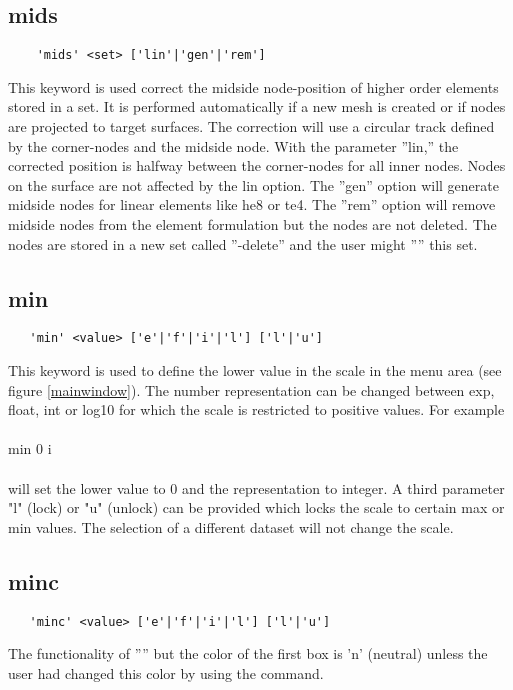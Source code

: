 \documentclass{article}
\begin{document}
\subsection{\label{mids}mids}
\begin{verbatim}
    'mids' <set> ['lin'|'gen'|'rem']
\end{verbatim}
This keyword is used correct the midside node-position of higher order elements stored in a set. It is performed automatically if a new mesh is created or if nodes are projected to target surfaces. The correction will use a circular track defined by the corner-nodes and the midside node. With the parameter ''lin,'' the corrected position is halfway between the corner-nodes for all inner nodes. Nodes on the surface are not affected by the lin option. The ''gen'' option will generate midside nodes for linear elements like he8 or te4. The ''rem'' option will remove midside nodes from the element formulation but the nodes are not deleted. The nodes are stored in a new set called ''-delete'' and the user might '''' this set. 

\subsection{\label{min}min}
\begin{verbatim}
   'min' <value> ['e'|'f'|'i'|'l'] ['l'|'u']
\end{verbatim}
This keyword is used to define the lower value in the scale in the menu area (see figure \ref{mainwindow}). The number representation can be changed between exp, float, int or log10 for which the scale is restricted to positive values. For example\\\\min 0 i\\\\will set the lower value to 0 and the representation to integer. A third parameter "l" (lock) or "u" (unlock) can be provided which locks the scale to certain max or min values. The selection of a different dataset will not change the scale.
 
\subsection{\label{minc}minc}
\begin{verbatim}
   'minc' <value> ['e'|'f'|'i'|'l'] ['l'|'u']
\end{verbatim}
The functionality of '''' but the color of the first box is 'n' (neutral) unless the user had changed this color by using the  command.
\end{document}
